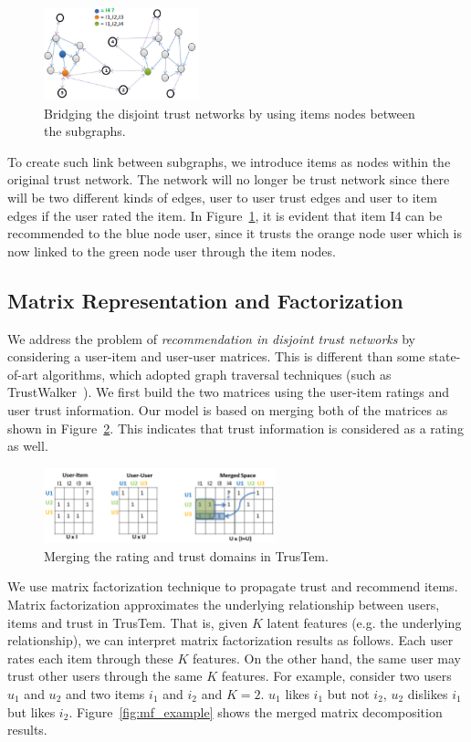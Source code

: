 \documentclass[11pt, conference, onecolumn]{IEEEtran}
\begin{document}
\begin{figure}[tp]
\centering
\includegraphics[width=0.4\textwidth]{fig2}
\caption{Bridging the disjoint trust networks by using items nodes between the subgraphs.}
\label{fig:link}
\end{figure}

To create such link between subgraphs, we introduce items as nodes within the original trust network. The network will no longer be trust network since there will be two different kinds of edges, user to user trust edges and user to item edges if the user rated the item. In Figure~\ref{fig:link}, it is evident that item I4 can be recommended to the blue node user, since it trusts the orange node user which is now linked to the green node user through the item nodes. 

\subsection{Matrix Representation and Factorization}
We address the problem of \textit{recommendation in disjoint trust networks} by considering a user-item and user-user matrices. This is different than some state-of-art algorithms, which adopted graph traversal techniques (such as TrustWalker~\cite{Jamali:2009}). We first build the two matrices using the user-item ratings and user trust information. Our model is based on merging both of the matrices as shown in Figure~\ref{fig:merge}. This indicates that trust information is considered as a rating as well.

\begin{figure}[tp]
\centering
\includegraphics[width=0.6\textwidth]{fig3}
\caption{Merging the rating and trust domains in TrusTem.}
\label{fig:merge}
\end{figure}

We use matrix factorization technique to propagate trust and recommend items. Matrix factorization approximates the underlying relationship between users, items and trust in TrusTem. That is, given $K$ latent features (e.g. the underlying relationship), we can interpret matrix factorization results as follows. Each user  rates each item through these $K$ features. On the other hand, the same user may trust other users through the same $K$ features. For example, consider two users $u_1$ and $u_2$ and two items $i_1$ and $i_2$ and $K=2$. $u_1$ likes $i_1$ but not $i_2$, $u_2$ dislikes $i_1$ but likes $i_2$. Figure~\ref{fig:mf_example} shows the  merged matrix decomposition results.
 
\end{document}
